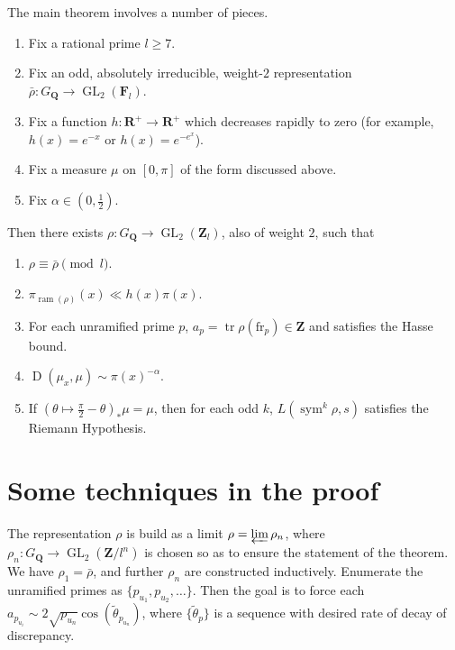 \documentclass{article}
\DeclareMathOperator{\D}{D}
\DeclareMathOperator{\GL}{GL}
\DeclareMathOperator{\ram}{ram}
\DeclareMathOperator{\sym}{sym}
\DeclareMathOperator{\tr}{tr}
\newcommand{\bF}{\mathbf{F}}
\newcommand{\bQ}{\mathbf{Q}}
\newcommand{\bR}{\mathbf{R}}
\newcommand{\bZ}{\mathbf{Z}}
\newcommand{\frob}{\mathrm{fr}}
\begin{document}
The main theorem involves a number of pieces.
\begin{enumerate}
\item
Fix a rational prime $l\geqslant 7$. 

\item
Fix an odd, absolutely irreducible, weight-$2$ representation 
$\bar\rho\colon G_\bQ \to \GL_2(\bF_l)$. 

\item
Fix a function $h\colon \bR^+ \to \bR^+$ which decreases rapidly to zero (for 
example, $h(x) = e^{-x}$ or $h(x) = e^{-e^x}$). 

\item
Fix a measure $\mu$ on $[0,\pi]$ of the form discussed above. 

\item
Fix $\alpha\in \left(0,\frac 1 2\right)$. 
\end{enumerate}
Then there exists $\rho\colon G_\bQ \to \GL_2(\bZ_l)$, also of weight $2$, 
such that 
\begin{enumerate}
\item
$\rho\equiv \bar\rho\pmod l$. 

\item
$\pi_{\ram(\rho)}(x) \ll h(x) \pi(x)$. 

\item
For each unramified prime $p$, $a_p = \tr \rho(\frob_p)\in \bZ$ and satisfies 
the Hasse bound. 

\item
$\D(\mu_x,\mu) \sim \pi(x)^{-\alpha}$. 

\item
If $(\theta\mapsto \frac \pi 2 - \theta)_\ast \mu = \mu$, then for each odd 
$k$, $L(\sym^k \rho,s)$ satisfies the Riemann Hypothesis. 
\end{enumerate}





\section{Some techniques in the proof}

The representation $\rho$ is build as a limit $\rho = \varprojlim \rho_n$, 
where $\rho_n\colon G_\bQ \to \GL_2(\bZ/l^n)$ is chosen so as to ensure the 
statement of the theorem. We have $\rho_1 = \bar\rho$, and further $\rho_n$ 
are constructed inductively. Enumerate the unramified primes as 
$\{p_{u_1},p_{u_2},\dots\}$. Then the goal is to force each 
$a_{p_{u_i}} \sim 2\sqrt{p_{u_n}} \cos(\widetilde \theta_{p_{u_n}})$, where 
$\{\widetilde\theta_p\}$ is a sequence with desired rate of decay of 
discrepancy. 
\end{document}
